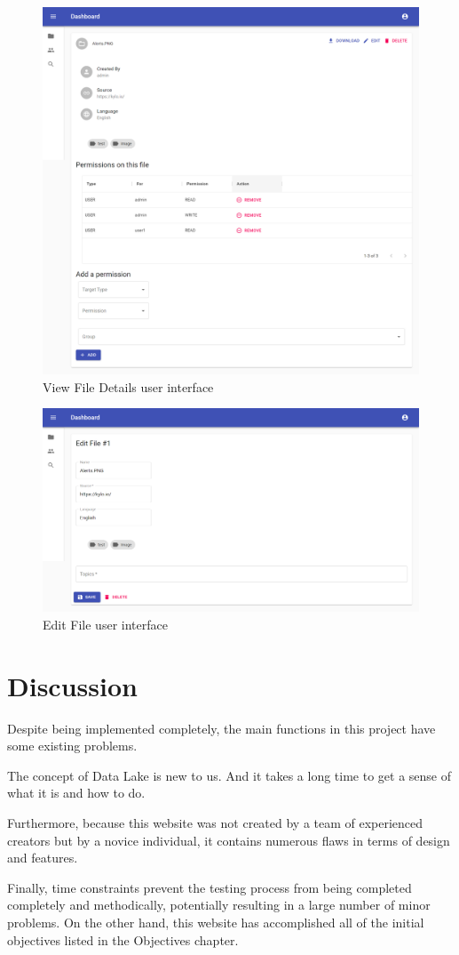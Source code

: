 \begin{figure}[H]
    \centering
    \includegraphics[width=1.0\textwidth]{images/File-ViewDetails.png}
    \caption{View File Details user interface}
    \label{fig:viewFile}
\end{figure}
\begin{figure}[H]
    \centering
    \includegraphics[width=1.0\textwidth]{images/File-Edit.png}
    \caption{Edit File user interface}
    \label{fig:editFile}
\end{figure}
\section{Discussion}
Despite being implemented completely, the main functions in this project have some existing
problems. 

The concept of Data Lake is new to us. And it takes a long time to get a sense of what it is and how to do.

Furthermore, because this website was not created by a team of experienced creators but by a novice individual, it contains numerous flaws in terms of design and features.

Finally, time constraints prevent the testing process from being completed completely and methodically, potentially resulting in a large number of minor problems. On the other hand, this website has accomplished all of the initial objectives listed in the Objectives chapter.